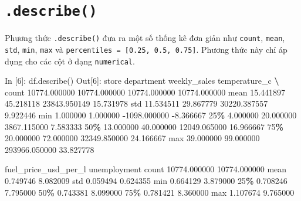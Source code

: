 \documentclass[
]{book}
\newenvironment{Shaded}{\begin{snugshade}}{\end{snugshade}}
\newcommand{\BuiltInTok}[1]{#1}
\newcommand{\DecValTok}[1]{\textcolor[rgb]{0.00,0.00,0.81}{#1}}
\newcommand{\FloatTok}[1]{\textcolor[rgb]{0.00,0.00,0.81}{#1}}
\newcommand{\NormalTok}[1]{#1}
\newcommand{\OperatorTok}[1]{\textcolor[rgb]{0.81,0.36,0.00}{\textbf{#1}}}
\begin{document}
\hypertarget{describe}{%
\section{\texorpdfstring{\texttt{.describe()}}{.describe()}}\label{describe}}

Phương thức \texttt{.describe()} đưa ra một số thống kê đơn giản như \texttt{count}, \texttt{mean}, \texttt{std}, \texttt{min}, \texttt{max} và \texttt{percentiles\ =\ {[}0.25,\ 0.5,\ 0.75{]}}. Phương thức này chỉ áp dụng cho các cột ở dạng \texttt{numerical}.

\begin{Shaded}
\begin{Highlighting}[]
\NormalTok{In [}\DecValTok{6}\NormalTok{]: df.describe()}
\NormalTok{Out[}\DecValTok{6}\NormalTok{]: }
\NormalTok{              store    department   weekly\_sales  temperature\_c  }\OperatorTok{\textbackslash{}}
\NormalTok{count  }\FloatTok{10774.000000}  \FloatTok{10774.000000}   \FloatTok{10774.000000}   \FloatTok{10774.000000}   
\NormalTok{mean      }\FloatTok{15.441897}     \FloatTok{45.218118}   \FloatTok{23843.950149}      \FloatTok{15.731978}   
\NormalTok{std       }\FloatTok{11.534511}     \FloatTok{29.867779}   \FloatTok{30220.387557}       \FloatTok{9.922446}   
\BuiltInTok{min}        \FloatTok{1.000000}      \FloatTok{1.000000}   \OperatorTok{{-}}\FloatTok{1098.000000}      \OperatorTok{{-}}\FloatTok{8.366667}   
\DecValTok{25}\OperatorTok{\%}        \FloatTok{4.000000}     \FloatTok{20.000000}    \FloatTok{3867.115000}       \FloatTok{7.583333}   
\DecValTok{50}\OperatorTok{\%}       \FloatTok{13.000000}     \FloatTok{40.000000}   \FloatTok{12049.065000}      \FloatTok{16.966667}   
\DecValTok{75}\OperatorTok{\%}       \FloatTok{20.000000}     \FloatTok{72.000000}   \FloatTok{32349.850000}      \FloatTok{24.166667}   
\BuiltInTok{max}       \FloatTok{39.000000}     \FloatTok{99.000000}  \FloatTok{293966.050000}      \FloatTok{33.827778}   

\NormalTok{       fuel\_price\_usd\_per\_l  unemployment  }
\NormalTok{count          }\FloatTok{10774.000000}  \FloatTok{10774.000000}  
\NormalTok{mean               }\FloatTok{0.749746}      \FloatTok{8.082009}  
\NormalTok{std                }\FloatTok{0.059494}      \FloatTok{0.624355}  
\BuiltInTok{min}                \FloatTok{0.664129}      \FloatTok{3.879000}  
\DecValTok{25}\OperatorTok{\%}                \FloatTok{0.708246}      \FloatTok{7.795000}  
\DecValTok{50}\OperatorTok{\%}                \FloatTok{0.743381}      \FloatTok{8.099000}  
\DecValTok{75}\OperatorTok{\%}                \FloatTok{0.781421}      \FloatTok{8.360000}  
\BuiltInTok{max}                \FloatTok{1.107674}      \FloatTok{9.765000}  
\end{Highlighting}
\end{Shaded}
\end{document}
